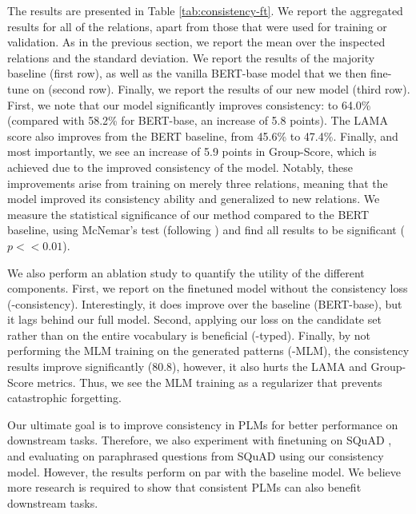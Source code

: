 The results are presented in Table
\ref{tab:consistency-ft}. We report the aggregated results
for all of the relations, apart from those that were used
for training or validation. As in the previous section, we
report the mean over the inspected relations and the
standard deviation.  We report the results of the majority
baseline (first row), as well as the vanilla BERT-base model
that we then fine-tune on (second row). Finally, we report
the results of our new model (third row).  First, we note
that our model significantly improves consistency:
to 64.0\%
(compared with 58.2\% for BERT-base,
an increase
of 5.8 points).  The LAMA score also improves from the BERT
baseline, from 45.6\% to 47.4\%. Finally, and most
importantly, we see an increase of 5.9 points in
Group-Score, which is achieved due to the improved
consistency of the model.  Notably, these improvements
arise from training on merely three relations, meaning that
the model improved its consistency ability and generalized
to new relations.  We measure the statistical
significance of our method compared to the BERT baseline,
using McNemar's test (following
\citet{dror2018hitchhiker,dror2020statistical}) and find all
results to be significant ($p<<0.01$).


We also perform an ablation study to quantify the utility of
the different components. First, we report on the finetuned
model without the consistency loss
(-consistency). Interestingly, it does improve over the
baseline (BERT-base), but it lags behind our full model.
Second, applying our loss on the candidate set rather than
on the entire vocabulary is beneficial (-typed). Finally, by
not performing the MLM training on the generated patterns
(-MLM), the consistency results improve significantly
(80.8), however, it also hurts the LAMA and Group-Score
metrics. Thus, we see the MLM training as a regularizer
that prevents catastrophic forgetting.


Our ultimate  goal is to improve consistency in PLMs
for better performance on downstream tasks. Therefore, we also
experiment with finetuning on SQuAD \cite{squad}, and
evaluating on paraphrased questions from SQuAD
\cite{squad-paraphrase} using our consistency
model. However, the results perform on par with the baseline
model.  We believe more research is required to show that
consistent PLMs can also benefit downstream tasks.

